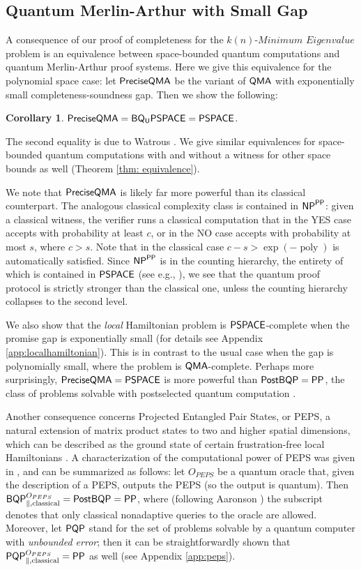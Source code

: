 \documentclass[11pt]{article}
\newtheorem{corollary}[theorem]{Corollary}
\theoremstyle{definition}
\theoremstyle{remark}
\newcommand\QMA{{\sf{QMA}}}
\newcommand\PSPACE{{\sf{PSPACE}}}
\newcommand\BQPSPACE{{\sf{BQ_{U}PSPACE}}}
\newcommand\PP{\sf{PP}}
\newcommand\NP{{\sf{NP}}}
\newcommand\BQP{{\sf{BQP}}}
\newcommand\PostBQP{{\sf{PostBQP}}}
\newcommand\PQP{{\sf{PQP}}}
\newcommand\preciseQMA{{\sf{PreciseQMA}}}
\newcommand\spechamiltonian[1]{\ensuremath{#1}\textit{-Minimum Eigenvalue}}
\DeclareMathOperator{\poly}{poly}
\begin{document}
\subsection{Quantum Merlin-Arthur with Small Gap}
A consequence of our proof of completeness for the $\spechamiltonian{k(n)}$ problem is an equivalence between space-bounded quantum computations and quantum Merlin-Arthur proof systems. Here we give this equivalence for the polynomial space case: let $\preciseQMA$ be the variant of $\QMA$ with exponentially small completeness-soundness gap. Then we show the following:
\begin{corollary} \label{cor: preciseqma}
$\preciseQMA = \BQPSPACE =  \PSPACE$.
\end{corollary}
The second equality is due to Watrous \cite{Watrous99,Watrous03}. We give similar equivalences for space-bounded quantum computations with and without a witness for other space bounds as well (Theorem \ref{thm: equivalence}).

We note that $\preciseQMA$ is likely far more powerful than its classical counterpart. The analogous classical complexity class is contained in $\NP^{\PP}$: given a classical witness, the verifier runs a classical computation that in the YES case accepts with probability at least $c$, or in the NO case accepts with probability at most $s$, where $c>s$. Note that in the classical case $c - s > \exp(-\poly)$ is automatically satisfied. Since $\NP^{\PP}$ is in the counting hierarchy, the entirety of which is contained in $\PSPACE$ (see e.g., \cite{allenderwagner}), we see that the quantum proof protocol is strictly stronger than the classical one, unless the counting hierarchy collapses to the second level.

We also show that the \emph{local} Hamiltonian problem is $\PSPACE$-complete when the promise gap is exponentially small (for details see Appendix \ref{app:localhamiltonian}). This is in contrast to the usual case when the gap is polynomially small, where the problem is $\QMA$-complete. Perhaps more surprisingly, $\preciseQMA = \PSPACE$ is more powerful than $\PostBQP=\PP$, the class of problems solvable with postselected quantum computation \cite{aaronson05}.

Another consequence concerns Projected Entangled Pair States, or PEPS, a natural extension of matrix product states to two and higher spatial dimensions, which can be described as the ground state of certain frustration-free local Hamiltonians \cite{vc04}. A characterization of the computational power of PEPS was given in \cite{swv07}, and can be summarized as follows: let $O_{PEPS}$ be a quantum oracle that, given the description of a PEPS, outputs the PEPS (so the output is quantum). Then $\BQP^{O_{PEPS}}_{\parallel,\text{classical}} = \PostBQP = \PP$, where (following Aaronson \cite{aaronson05}) the subscript  denotes that only classical nonadaptive queries to the oracle are allowed. Moreover, let $\PQP$ stand for the set of problems solvable by a quantum computer with \emph{unbounded error}; then it can be straightforwardly shown that $\PQP^{O_{PEPS}}_{\parallel,\text{classical}} = \PP$ as well (see Appendix \ref{app:peps}).
\end{document}
